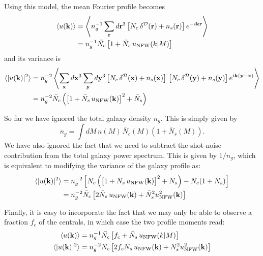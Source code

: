 \documentclass{article}
\begin{document}
Using this model, the mean Fourier profile becomes
\begin{align}
 \langle u({\bf k})\rangle
 &=\left\langle n_g^{-1}\sum_{\bf r} d{\bf r}^3 \left[N_c\,\delta^{\cal D}({\bf r})+n_s({\bf r})\right]e^{-i{\bf k}{\bf r}}\right\rangle\\
 &=n_g^{-1}\bar{N_c}\left[1+\bar{N}_s\,u_{\rm NFW}(k|M)\right]\\
\end{align}
and its variance is
\begin{align}
  \langle |u({\bf k})|^2\rangle
  &=n_g^{-2}\left\langle \sum_{\bf x} d{\bf x}^3\sum_{\bf y} d{\bf y}^3 \left[N_c\,\delta^{\cal D}({\bf x})+n_s({\bf x})\right]\,\left[N_c\,\delta^{\cal D}({\bf y})+n_s({\bf y})\right]e^{i{\bf k}({\bf y}-{\bf x})}\right\rangle\\ 
  &=n_g^{-2}\bar{N}_c\left(\left[1+\bar{N}_s\,u_{\rm NFW}({\bf k})\right]^2+\bar{N}_s\right)
\end{align}

So far we have ignored the total galaxy density $n_g$. This is simply given by 
\begin{equation}
  n_g=\int dM\,n(M)\,\bar{N}_c(M)\left(1+\bar{N}_s(M)\right).
\end{equation}
We have also ignored the fact that we need to subtract the shot-noise contribution from the total galaxy power spectrum. This is given by $1/n_g$, which is equivalent to modifying the variance of the galaxy profile as:
\begin{align}
  \langle |u({\bf k})|^2\rangle
  &=n_g^{-2}\left[\bar{N}_c\left(\left[1+\bar{N}_s\,u_{\rm NFW}({\bf k})\right]^2+\bar{N}_s\right)-\bar{N}_c(1+\bar{N}_s)\right]\\
  &=n_g^{-2}\bar{N}_c\left[2\bar{N}_s\,u_{\rm NFW}({\bf k})+\bar{N}_s^2u_{\rm NFW}^2({\bf k})\right]
\end{align}

Finally, it is easy to incorporate the fact that we may only be able to observe a fraction $f_c$ of the centrals, in which case the two profile moments read:
\begin{align}
 \langle u({\bf k})\rangle
 &=n_g^{-1}\bar{N_c}\left[f_c+\bar{N}_s\,u_{\rm NFW}(k|M)\right]\\
  \langle |u({\bf k})|^2\rangle
  &=n_g^{-2}\bar{N}_c\left[2f_c\bar{N}_s\,u_{\rm NFW}({\bf k})+\bar{N}_s^2u_{\rm NFW}^2({\bf k})\right]
\end{align}




\end{document}
